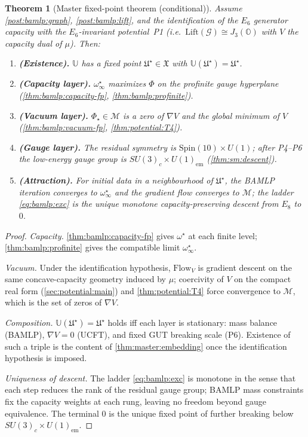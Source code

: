 \documentclass[11pt]{article}
\theoremstyle{plain}
\newtheorem{theorem}{Theorem}[section]
\theoremstyle{definition}
\theoremstyle{remark}
\begin{document}
\begin{theorem}[Master fixed-point theorem (conditional)]\label{thm:bamlp:universe}
Assume \autoref{post:bamlp:graph}, \autoref{post:bamlp:lift}, and the
identification of the $E_6$ generator capacity with the $E_6$-invariant
potential~\textnormal{P1} (i.e.\ $\mathrm{Lift}(\mathcal{G})\cong J_3(\mathbb{O})$
with $V$ the capacity dual of $\mu$). Then:
\begin{enumerate}[label=\textup{(\alph*)}]
  \item \textbf{(Existence).} $\mathbb{U}$ has a fixed point
    $\mathfrak{U}^\star\in\mathfrak{X}$ with $\mathbb{U}(\mathfrak{U}^\star)=
    \mathfrak{U}^\star$.
  \item \textbf{(Capacity layer).} $\omega^\star_\infty$ maximizes $\Phi$ on the
    profinite gauge hyperplane (\autoref{thm:bamlp:capacity-fp},
    \autoref{thm:bamlp:profinite}).
  \item \textbf{(Vacuum layer).} $\Phi_\star\in\mathcal{M}$ is a zero of
    $\nabla V$ and the global minimum of $V$ (\autoref{thm:bamlp:vacuum-fp},
    \autoref{thm:potential:T4}).
  \item \textbf{(Gauge layer).} The residual symmetry is
    $\mathrm{Spin}(10)\times U(1)$; after P4--P6 the low-energy gauge group is
    $SU(3)_c\times U(1)_{\mathrm{em}}$ (\autoref{thm:sm:descent}).
  \item \textbf{(Attraction).} For initial data in a neighbourhood of
    $\mathfrak{U}^\star$, the BAMLP iteration converges to $\omega^\star_\infty$
    and the gradient flow converges to $\mathcal{M}$; the ladder
    \eqref{eq:bamlp:exc} is the unique monotone capacity-preserving descent
    from $E_8$ to $0$.
\end{enumerate}
\end{theorem}

\begin{proof}
\emph{Capacity.} \autoref{thm:bamlp:capacity-fp} gives $\omega^\star$ at each
finite level; \autoref{thm:bamlp:profinite} gives the compatible limit
$\omega^\star_\infty$.

\emph{Vacuum.} Under the identification hypothesis, $\mathrm{Flow}_V$ is gradient
descent on the same concave-capacity geometry induced by $\mu$; coercivity of
$V$ on the compact real form (\autoref{sec:potential:main}) and
\autoref{thm:potential:T4} force convergence to $\mathcal{M}$, which is the
set of zeros of $\nabla V$.

\emph{Composition.} $\mathbb{U}(\mathfrak{U}^\star)=\mathfrak{U}^\star$ holds
iff each layer is stationary: mass balance (BAMLP), $\nabla V=0$ (UCFT), and
fixed GUT breaking scale (P6). Existence of such a triple is the content of
\autoref{thm:master:embedding} once the identification hypothesis is imposed.

\emph{Uniqueness of descent.} The ladder \eqref{eq:bamlp:exc} is monotone in
the sense that each step reduces the rank of the residual gauge group; BAMLP
mass constraints fix the capacity weights at each rung, leaving no freedom
beyond gauge equivalence. The terminal $0$ is the unique fixed point of
further breaking below $SU(3)_c\times U(1)_{\mathrm{em}}$.
\end{proof}
\end{document}
